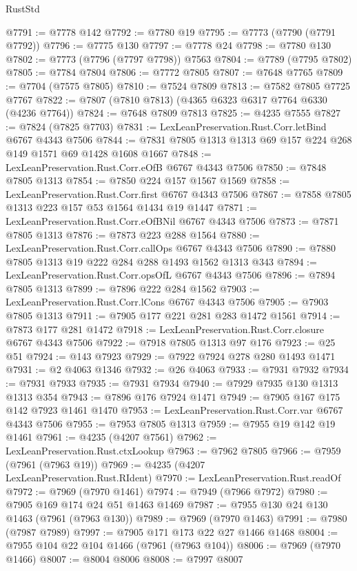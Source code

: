 \begin{lexlean}{RustStd}
\begin{coremodule}
@7791 := @7778 @142
@7792 := @7780 @19
@7795 := @7773 (@7790 (@7791 @7792))
@7796 := @7775 @130
@7797 := @7778 @24
@7798 := @7780 @130
@7802 := @7773 (@7796 (@7797 @7798)) @7563
@7804 := @7789 (@7795 @7802)
@7805 := @7784 @7804
@7806 := @7772 @7805
@7807 := @7648 @7765
@7809 := @7704 (@7575 @7805)
@7810 := @7524 @7809
@7813 := @7582 @7805 @7725 @7767
@7822 := @7807 (@7810 @7813) (@4365 @6323 @6317 @7764 @6330 (@4236 @7764))
@7824 := @7648 @7809 @7813
@7825 := @4235 @7555
@7827 := @7824 (@7825 @7703)
@7831 := LexLeanPreservation.Rust.Corr.letBind @6767 @4343 @7506
@7844 := @7831 @7805 @1313 @1313 @69 @157 @224 @268 @149 @1571 @69 @1428 @1608 @1667
@7848 := LexLeanPreservation.Rust.Corr.eOfB @6767 @4343 @7506
@7850 := @7848 @7805 @1313
@7854 := @7850 @224 @157 @1567 @1569
@7858 := LexLeanPreservation.Rust.Corr.first @6767 @4343 @7506
@7867 := @7858 @7805 @1313 @223 @157 @53 @1564 @1434 @19 @1447
@7871 := LexLeanPreservation.Rust.Corr.eOfBNil @6767 @4343 @7506
@7873 := @7871 @7805 @1313
@7876 := @7873 @223 @288 @1564
@7880 := LexLeanPreservation.Rust.Corr.callOps @6767 @4343 @7506
@7890 := @7880 @7805 @1313 @19 @222 @284 @288 @1493 @1562 @1313 @343
@7894 := LexLeanPreservation.Rust.Corr.opsOfL @6767 @4343 @7506
@7896 := @7894 @7805 @1313
@7899 := @7896 @222 @284 @1562
@7903 := LexLeanPreservation.Rust.Corr.lCons @6767 @4343 @7506
@7905 := @7903 @7805 @1313
@7911 := @7905 @177 @221 @281 @283 @1472 @1561
@7914 := @7873 @177 @281 @1472
@7918 := LexLeanPreservation.Rust.Corr.closure @6767 @4343 @7506
@7922 := @7918 @7805 @1313 @97 @176
@7923 := @25 @51
@7924 := @143 @7923
@7929 := @7922 @7924 @278 @280 @1493 @1471
@7931 := @2 @4063 @1346
@7932 := @26 @4063
@7933 := @7931 @7932
@7934 := @7931 @7933
@7935 := @7931 @7934
@7940 := @7929 @7935 @130 @1313 @1313 @354
@7943 := @7896 @176 @7924 @1471
@7949 := @7905 @167 @175 @142 @7923 @1461 @1470
@7953 := LexLeanPreservation.Rust.Corr.var @6767 @4343 @7506
@7955 := @7953 @7805 @1313
@7959 := @7955 @19 @142 @19 @1461
@7961 := @4235 (@4207 @7561)
@7962 := LexLeanPreservation.Rust.ctxLookup
@7963 := @7962 @7805
@7966 := @7959 (@7961 (@7963 @19))
@7969 := @4235 (@4207 LexLeanPreservation.Rust.RIdent)
@7970 := LexLeanPreservation.Rust.readOf
@7972 := @7969 (@7970 @1461)
@7974 := @7949 (@7966 @7972)
@7980 := @7905 @169 @174 @24 @51 @1463 @1469
@7987 := @7955 @130 @24 @130 @1463 (@7961 (@7963 @130))
@7989 := @7969 (@7970 @1463)
@7991 := @7980 (@7987 @7989)
@7997 := @7905 @171 @173 @22 @27 @1466 @1468
@8004 := @7955 @104 @22 @104 @1466 (@7961 (@7963 @104))
@8006 := @7969 (@7970 @1466)
@8007 := @8004 @8006
@8008 := @7997 @8007

\end{coremodule}
\end{lexlean}
